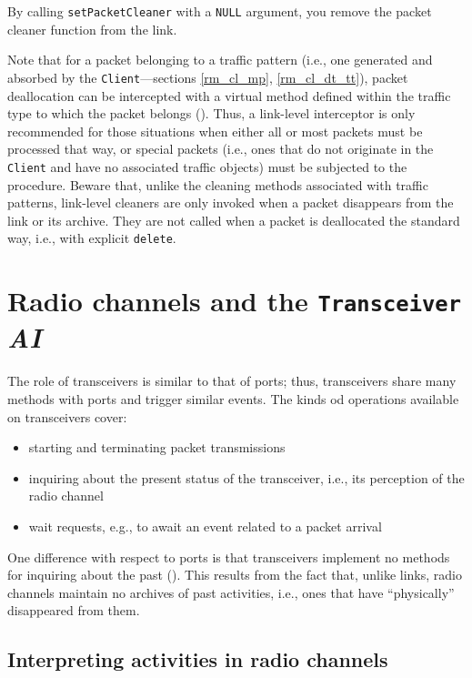 By calling {\tt setPacketCleaner} with a {\tt NULL} argument, you remove the
packet cleaner function from the link.

Note that for a packet belonging to a traffic pattern (i.e., one generated and
absorbed by the {\tt Client}---sections \ref{rm_cl_mp},
\ref{rm_cl_dt_tt}), packet deallocation can be intercepted with
a virtual method defined within the traffic type to which the packet
belongs ().
Thus, a link-level interceptor is only recommended for those situations when
either all or most packets must be processed that way, or
special packets (i.e., ones that do not originate in the {\tt Client} and have
no associated traffic objects)
must be subjected to the procedure.
Beware that, unlike the cleaning methods associated with traffic patterns,
link-level cleaners are only invoked when a packet disappears from the link
or its archive.
They are not called when a packet is deallocated the standard way, i.e., with
explicit {\tt delete}.

\section{Radio channels and the {\tt Transceiver} {\em AI\/}}
\label{rm_tr}

The role of transceivers is similar to that of ports; thus,
transceivers share many methods with ports and trigger similar events.
The kinds od operations available on transceivers cover:
\begin{itemize}
\item
starting and terminating packet transmissions
\item
inquiring about the present status of the transceiver, i.e., its perception of
the radio channel
\item
wait requests, e.g., to await an event related to a packet arrival
\end{itemize}

One difference with respect to ports is that transceivers implement no methods
for inquiring about the past ().
This results from the fact that, unlike links, radio channels maintain no
archives of past activities, i.e., ones that have ``physically''
disappeared from them.

\subsection{Interpreting activities in radio channels}
\label{rm_tr_ra}

